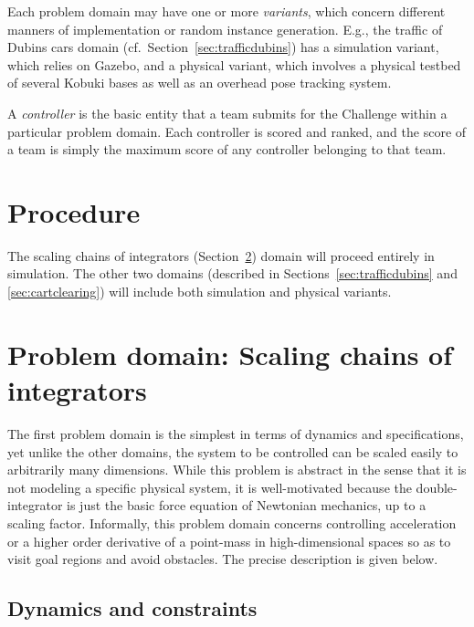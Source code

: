 \documentclass{amsart}
\theoremstyle{definition}
\begin{document}
Each problem domain may have one or more \textit{variants}, which concern
different manners of implementation or random instance generation.  E.g., the
traffic of Dubins cars domain (cf.\ Section~\ref{sec:trafficdubins}) has a
simulation variant, which relies on Gazebo, and a physical variant, which
involves a physical testbed of several Kobuki bases as well as an overhead pose
tracking system.

A \textit{controller} is the basic entity that a team submits for the Challenge
within a particular problem domain.  Each controller is scored and ranked, and
the score of a team is simply the maximum score of any controller belonging to
that team.


\section{Procedure}

The scaling chains of integrators (Section~\ref{sec:scalingcinteg}) domain
will proceed entirely in simulation.  The other two domains (described in
Sections~\ref{sec:trafficdubins} and \ref{sec:cartclearing}) will include both
simulation and physical variants.


\section{Problem domain: Scaling chains of integrators}\label{sec:scalingcinteg}

The first problem domain is the simplest in terms of dynamics and
specifications, yet unlike the other domains, the system to be controlled can be
scaled easily to arbitrarily many dimensions.  While this problem is abstract in
the sense that it is not modeling a specific physical system, it is
well-motivated because the double-integrator is just the basic force equation of
Newtonian mechanics, up to a scaling factor.  Informally, this problem domain
concerns controlling acceleration or a higher order derivative of a point-mass
in high-dimensional spaces so as to visit goal regions and avoid obstacles.  The
precise description is given below.

\subsection{Dynamics and constraints}
\end{document}
